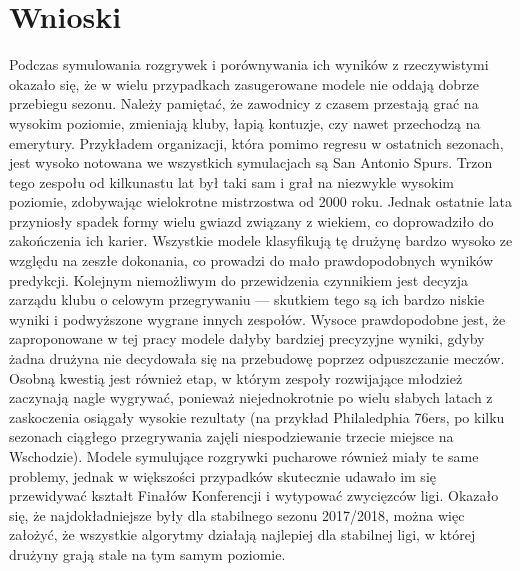 \documentclass[inzynierska]{pwr_wmat_praca_dyplomowa}
\theoremstyle{plain}
\numberwithin{theorem}{chapter}
\theoremstyle{definition}
\numberwithin{theorem}{chapter}
\begin{document}
\chapter{Wnioski}
Podczas symulowania rozgrywek i porównywania ich wyników z rzeczywistymi okazało się, że w wielu przypadkach zasugerowane modele nie oddają dobrze przebiegu sezonu. Należy pamiętać, że zawodnicy z czasem przestają grać na wysokim poziomie, zmieniają kluby, łapią kontuzje, czy nawet przechodzą na emerytury. Przykładem organizacji, która pomimo regresu w ostatnich sezonach, jest wysoko notowana we wszystkich symulacjach są San Antonio Spurs. Trzon tego zespołu od kilkunastu lat był taki sam i grał na niezwykle wysokim poziomie, zdobywając wielokrotne mistrzostwa od 2000 roku. Jednak ostatnie lata przyniosły spadek formy wielu gwiazd związany z wiekiem, co doprowadziło do zakończenia ich karier. Wszystkie modele klasyfikują tę drużynę bardzo wysoko ze względu na zeszłe dokonania, co prowadzi do mało prawdopodobnych wyników predykcji. Kolejnym niemożliwym do przewidzenia czynnikiem jest decyzja zarządu klubu o celowym przegrywaniu --- skutkiem tego są ich bardzo niskie wyniki i podwyższone wygrane innych zespołów. Wysoce prawdopodobne jest, że zaproponowane w tej pracy modele dałyby bardziej precyzyjne wyniki, gdyby żadna drużyna nie decydowała się na przebudowę poprzez odpuszczanie meczów. Osobną kwestią jest również etap, w którym zespoły rozwijające młodzież zaczynają nagle wygrywać, ponieważ niejednokrotnie po wielu słabych latach z zaskoczenia osiągały wysokie rezultaty (na przykład Philaledphia 76ers, po kilku sezonach ciągłego przegrywania zajęli niespodziewanie trzecie miejsce na Wschodzie). Modele symulujące rozgrywki pucharowe również miały te same problemy, jednak w większości przypadków skutecznie udawało im się przewidywać kształt Finałów Konferencji i wytypować zwycięzców ligi. Okazało się, że najdokładniejsze były dla stabilnego sezonu 2017/2018, można więc założyć, że wszystkie algorytmy działają najlepiej dla stabilnej ligi, w której drużyny grają stale na tym samym poziomie.
\end{document}
